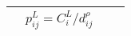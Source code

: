 \documentclass{article}
\begin{document}
\begin{table}
\begin{tabular}{lllr}
\citep{gustafson2017identifying} &
$p_{i j}^{L}=C_{i}^{L} / d_{i j}^{\rho}$ &
&\\                                            

\bottomrule
\end{tabular}
\end{table}

\end{document}
